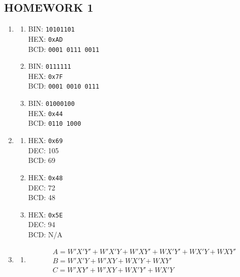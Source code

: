 \documentclass[10pt]{article}
\begin{document}

\begin{centering}
  \section*{HOMEWORK 1}
\end{centering}

\begin{enumerate}
  \item
  \begin{enumerate}
    \item 
      BIN: \texttt{10101101} \\
      HEX: \texttt{0xAD} \\
      BCD: \texttt{0001 0111 0011}
    \item 
      BIN: \texttt{0111111} \\
      HEX: \texttt{0x7F} \\
      BCD: \texttt{0001 0010 0111}
    \item 
      BIN: \texttt{01000100} \\
      HEX: \texttt{0x44} \\
      BCD: \texttt{0110 1000}
  \end{enumerate}
  \item 
  \begin{enumerate}
    \item 
      HEX: \texttt{0x69} \\
      DEC: 105 \\
      BCD: 69
    \item 
      HEX: \texttt{0x48} \\
      DEC: 72 \\
      BCD: 48
    \item 
      HEX: \texttt{0x5E} \\
      DEC: 94 \\
      BCD: N/A
  \end{enumerate}
  \item 
  \begin{enumerate}
    \item 
      \begin{gather*}
        A=W'X'Y'+W'X'Y+W'XY'+WX'Y'+WX'Y+WXY' \\
        B=W'X'Y+W'XY+WX'Y+WXY' \\
        C=W'XY'+W'XY+WX'Y'+WX'Y
      \end{gather*}
      \begin{figure} [H]

\end{figure}
\end{enumerate}
\end{enumerate}
\end{document}

